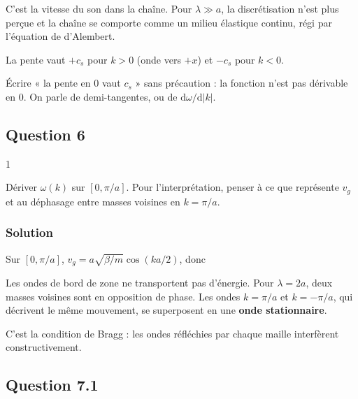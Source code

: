 \documentclass[11pt,a4paper]{article}
\newcommand{\equationajustee}[1]{%
  \sbox{\boiteequation}{$\displaystyle #1$}%
  \ifdim\wd\boiteequation>\linewidth
    \[\resizebox{\linewidth}{!}{\usebox{\boiteequation}}\]%
  \else
    \[#1\]%
  \fi}
\begin{document}
\equationajustee{\boxed{c_s=a\sqrt{\frac{\beta}{m}}}}

C'est la vitesse du son dans la chaîne. Pour \(\lambda\gg a\), la discrétisation n'est plus perçue et la chaîne se comporte comme un milieu élastique continu, régi par l'équation de d'Alembert.

La pente vaut \(+c_s\) pour \(k>0\) (onde vers \(+x\)) et \(-c_s\) pour \(k<0\).

\begin{piege}

Écrire « la pente en \(0\) vaut \(c_s\) » sans précaution : la fonction n'est pas dérivable en \(0\). On parle de demi-tangentes, ou de \(\mathrm d\omega/\mathrm d\lvert k\rvert\).

\end{piege}

\hypertarget{question-6}{%
\subsection{Question 6}\label{question-6}}

\begin{indication}{1}

Dériver \(\omega(k)\) sur \([0,\pi/a]\). Pour l'interprétation, penser à ce que représente \(v_g\) et au déphasage entre masses voisines en \(k=\pi/a\).

\end{indication}

\hypertarget{solution-5}{%
\subsubsection{Solution}\label{solution-5}}

Sur \([0,\pi/a]\), \(v_g=a\sqrt{\beta/m}\cos(ka/2)\), donc

\equationajustee{\boxed{v_g\left(\pm\frac{\pi}{a}\right)=0}}

Les ondes de bord de zone ne transportent pas d'énergie. Pour \(\lambda=2a\), deux masses voisines sont en opposition de phase. Les ondes \(k=\pi/a\) et \(k=-\pi/a\), qui décrivent le même mouvement, se superposent en une \textbf{onde stationnaire}.

C'est la condition de Bragg : les ondes réfléchies par chaque maille interfèrent constructivement.

\hypertarget{question-7.1}{%
\subsection{Question 7.1}\label{question-7.1}}
\end{document}
